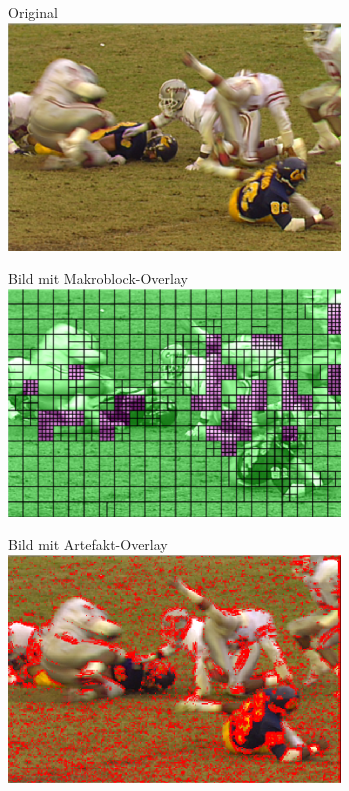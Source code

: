 \documentclass[t]{beamer}
\begin{document}
\begin{frame}
	\begin{center}
		Original ~\\
		\includegraphics[scale=.2]{football-original.png}	
	\end{center}
	\begin{minipage}{5cm}
		\begin{center}
			Bild mit Makroblock-Overlay ~\\
			\includegraphics[scale=.2]{football-macroblock.png}		
		\end{center}	
	\end{minipage}
	\hfill
	\begin{minipage}{5cm}
		\begin{center}
			Bild mit Artefakt-Overlay ~\\
			\includegraphics[scale=.455]{football-artifact.png}
		\end{center}	
	\end{minipage}
	\hfill
\end{frame}
\end{document}
